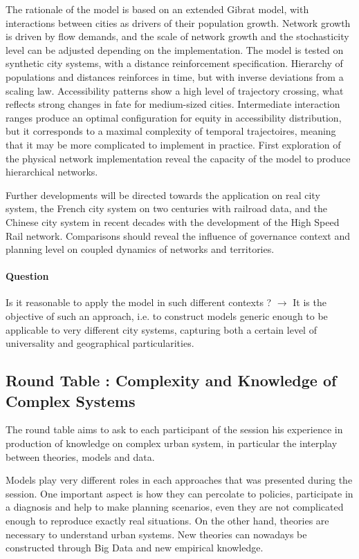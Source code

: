 \documentclass[10pt]{article}
\begin{document}
The rationale of the model is based on an extended Gibrat model, with interactions between cities as drivers of their population growth. Network growth is driven by flow demands, and the scale of network growth and the stochasticity level can be adjusted depending on the implementation. The model is tested on synthetic city systems, with a distance reinforcement specification. Hierarchy of populations and distances reinforces in time, but with inverse deviations from a scaling law. Accessibility patterns show a high level of trajectory crossing, what reflects strong changes in fate for medium-sized cities. Intermediate interaction ranges produce an optimal configuration for equity in accessibility distribution, but it corresponds to a maximal complexity of temporal trajectoires, meaning that it may be more complicated to implement in practice. First exploration of the physical network implementation reveal the capacity of the model to produce hierarchical networks.


Further developments will be directed towards the application on real city system, the French city system on two centuries with railroad data, and the Chinese city system in recent decades with the development of the High Speed Rail network. Comparisons should reveal the influence of governance context and planning level on coupled dynamics of networks and territories.


\paragraph{Question}

Is it reasonable to apply the model in such different contexts ? $\rightarrow$ It is the objective of such an approach, i.e. to construct models generic enough to be applicable to very different city systems, capturing both a certain level of universality and geographical particularities.



\subsection*{Round Table : Complexity and Knowledge of Complex Systems}

The round table aims to ask to each participant of the session his experience in production of knowledge on complex urban system, in particular the interplay between theories, models and data.


Models play very different roles in each approaches that was presented during the session. One important aspect is how they can percolate to policies, participate in a diagnosis and help to make planning scenarios, even they are not complicated enough to reproduce exactly real situations. On the other hand, theories are necessary to understand urban systems. New theories can nowadays be constructed through Big Data and new empirical knowledge.
\end{document}
